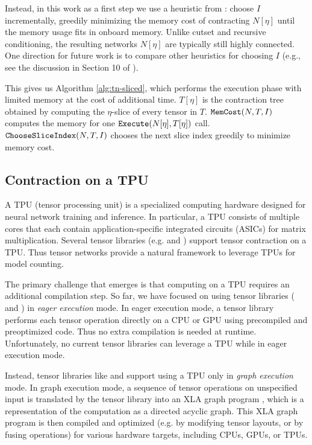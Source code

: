 Instead, in this work as a first step we use a heuristic from \cite{CZHNS18,GK20}: choose $I$ incrementally, greedily minimizing the memory cost of contracting $N[\eta]$ until the memory usage fits in onboard memory. Unlike cutset and recursive conditioning, the resulting networks $N[\eta]$ are typically still highly connected. One direction for future work is to compare other heuristics for choosing $I$ (e.g., see the discussion in Section 10 of \cite{dechter99}).

This gives us Algorithm \ref{alg:tn-sliced}, which performs the execution phase with limited memory at the cost of additional time. $T[\eta]$ is the contraction tree obtained by computing the $\eta$-slice of every tensor in $T$. $\texttt{\upshape MemCost}(N, T, I)$ computes the memory for one $\texttt{\upshape Execute}(N[\eta], T[\eta])$ call. $\texttt{\upshape ChooseSliceIndex}(N,T,I)$ chooses the next slice index greedily to minimize memory cost.

\subsection{Contraction on a TPU}
\label{sec:parallel:execution:tpu}
A TPU (tensor processing unit) \cite{JYPPABBBBB17} is a specialized computing hardware designed for neural network training and inference.
In particular, a TPU consists of multiple cores that each contain application-specific integrated circuits (ASICs) for matrix multiplication.
Several tensor libraries (e.g.  \cite{ABCCDDDGII16} and  \cite{jax2018github}) support tensor contraction on a TPU.
Thus tensor networks provide a natural framework to leverage TPUs for model counting.

The primary challenge that emerges is that computing on a TPU requires an additional compilation step.
So far, we have focused on using tensor libraries ( \cite{numpy} and  \cite{ABCCDDDGII16}) in \emph{eager execution} mode.
In eager execution mode, a tensor library performs each tensor operation directly on a CPU or GPU using precompiled and preoptimized code.
Thus no extra compilation is needed at runtime.
Unfortunately, no current tensor libraries can leverage a TPU while in eager execution mode.

Instead, tensor libraries like  \cite{ABCCDDDGII16} and  \cite{jax2018github} support using a TPU only in \emph{graph execution} mode. 
In graph execution mode, a sequence of tensor operations on unspecified input is translated by the tensor library into an XLA graph program \cite{XLA}, which is a representation of the computation as a directed acyclic graph. 
This XLA graph program is then compiled and optimized (e.g. by modifying tensor layouts, or by fusing operations) for various hardware targets, including CPUs, GPUs, or TPUs. 

